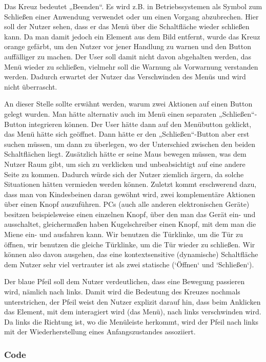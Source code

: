 Das Kreuz bedeutet „Beenden“. Es wird z.B. in Betriebssystemen als Symbol zum Schließen einer Anwendung verwendet oder um einen Vorgang abzubrechen. Hier soll der Nutzer sehen, dass er das Menü über die Schaltfläche wieder schließen kann. Da man damit jedoch ein Element aus dem Bild entfernt, wurde das Kreuz orange gefärbt, um den Nutzer vor jener Handlung zu warnen und den Button auffälliger zu machen. Der User soll damit nicht davon abgehalten werden, das Menü wieder zu schließen, vielmehr soll die Warnung als Vorwarnung verstanden werden. Dadurch erwartet der Nutzer das Verschwinden des Menüs und wird nicht überrascht.

An dieser Stelle sollte erwähnt werden, warum zwei Aktionen auf einen Button gelegt wurden. Man hätte alternativ auch im Menü einen separaten „Schließen“-Button integrieren können. Der User hätte dann auf den Menübutton geklickt, das Menü hätte sich geöffnet. Dann hätte er den „Schließen“-Button aber erst suchen müssen, um dann zu überlegen, wo der Unterschied zwischen den beiden Schaltflächen liegt. Zusätzlich hätte er seine Maus bewegen müssen, was dem Nutzer Raum gibt, um sich zu verklicken und unbeabsichtigt auf eine andere Seite zu kommen. Dadurch würde sich der Nutzer ziemlich ärgern, da solche Situationen hätten vermieden werden können. Zuletzt kommt erschwerend dazu, dass man von Kindesbeinen daran gewöhnt wird, zwei komplementäre Aktionen über einen Knopf auszuführen. PCs (auch alle anderen elektronischen Geräte) besitzen beispielsweise einen einzelnen Knopf, über den man das Gerät ein- und ausschaltet, gleichermaßen haben Kugelschreiber einen Knopf, mit dem man die Miene ein- und ausfahren kann. Wir benutzen die Türklinke, um die Tür zu öffnen, wir benutzen die gleiche Türklinke, um die Tür wieder zu schließen. Wir können also davon ausgehen, das  eine kontextsensitive (dynamische) Schaltfläche dem Nutzer sehr viel vertrauter ist als zwei statische (`Öffnen` und `Schließen`).

Der blaue Pfeil soll dem Nutzer verdeutlichen, dass eine Bewegung passieren wird, nämlich nach links. Damit wird die Bedeutung des Kreuzes nochmals unterstrichen, der Pfeil weist den Nutzer explizit darauf hin, dass beim Anklicken das Element, mit dem interagiert wird (das Menü), nach links verschwinden wird. Da links die Richtung ist, wo die Menüleiste herkommt, wird der Pfeil nach links mit der Wiederherstellung eines Anfangszustandes assoziiert.


\subsubsection{Code}

